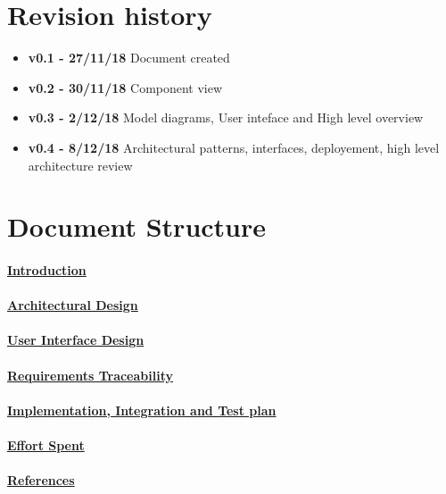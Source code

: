 \section{Revision history}
\begin{itemize}
\item \textbf{v0.1 - 27/11/18} Document created
\item \textbf{v0.2 - 30/11/18} Component view
\item \textbf{v0.3 - 2/12/18} Model diagrams, User inteface and High level overview
\item \textbf{v0.4 - 8/12/18} Architectural patterns, interfaces, deployement, high level architecture review
\end{itemize}
\section{Document Structure}
\paragraph{\hyperref[sect:introduction]{Introduction}}
\paragraph{\hyperref[sect:architecturalDesign]{Architectural Design}} 
\paragraph{\hyperref[sect:userInterfaceDesign]{User	 Interface Design}}
\paragraph{\hyperref[sect:requirementsTraceability]{Requirements Traceability}}
\paragraph{\hyperref[sect:implementationIntegrationTestplan]{Implementation, Integration and Test plan}}
\paragraph{\hyperref[sect:effort]{Effort Spent}}
\paragraph{\hyperref[sect:references]{References}} 


